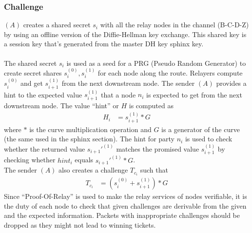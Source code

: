 \subsubsection{Challenge}
$(A)$ creates a shared secret $s_i$ with all the relay nodes in the channel (B-C-D-Z) by using an offline version of the Diffie-Hellman key exchange. This shared key is a session key that's generated from the master DH key sphinx key.
    \\~\\ The shared secret $s_i$ is used as a seed for a PRG (Pseudo Random Generator) to create secret shares $s_i^{(0)},s_i^{(1)}$ for each node along the route.
    Relayers compute $s_i^{(0)}$ and get $s_{i+1}^{(1)}$ from the next downstream node.
    \newline The sender $(A)$ provides a hint to the expected value $s_{i+1}^{(1)}$ that a node $n_i$ is expected to get from the next downstream node.
    The value “hint” or $H$ is computed as 
    \begin{align}  
        H_i&=s_{i+1}^{(1)}*G
         \end{align}
    where $*$ is the curve multiplication operation and $G$ is a generator of the curve (the same used in the sphinx section). 
    \newline The hint for party $n_i$ is used to check whether the returned value $s_{i+1}'^{(1)}$ matches the promised value $s_{i+1}^{(1)}$ by checking whether $hint_i$ equals $s_{i+1}'^{(1)}*G$. 
   \\The sender $(A)$ also creates a challenge $T_{c_i}$ such that 
   \begin{align}  
    T_{c_i}&=(s_i^{(0)}+s_{i+1}^{(1)})*G
     \end{align}
   Since “Proof-Of-Relay” is used to make the relay services of nodes verifiable, it is the duty of each node to check that given challenges are derivable from the given and the expected information.
Packets with inappropriate challenges should be dropped as they might not lead to winning tickets.
